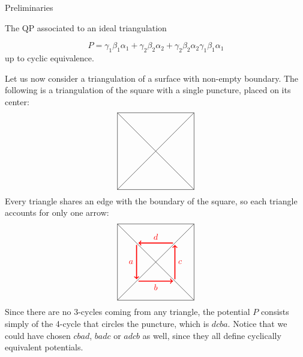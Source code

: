 \begin{chapter}{Preliminaries}
\begin{section}{The QP associated to an ideal triangulation}
\begin{exmp}
\[P = \gamma_1\beta_1\alpha_1+\gamma_2\beta_2\alpha_2+\gamma_2\beta_2\alpha_2\gamma_1\beta_1\alpha_1\]
up to cyclic equivalence.
\end{exmp}
\begin{exmp} Let us now consider a triangulation of a surface with non-empty boundary. The following is a triangulation of the square with a single puncture, placed on its center:
\[
\begin{tikzpicture}[scale=0.8]
\draw (-2,-2) to (-2,2);
\draw (-2,2) to (2,2);
\draw (2,2) to (2,-2);
\draw (2,-2) to (-2,-2);
\draw (-2,-2) to (2,2);
\draw (-2,2) to (2,-2);
\end{tikzpicture}
\]
Every triangle shares an edge with the boundary of the square, so each triangle accounts for only one arrow:
\[
\begin{tikzpicture}[scale=0.8]
\draw (-2,-2) to (-2,2);
\draw (-2,2) to (2,2);
\draw (2,2) to (2,-2);
\draw (2,-2) to (-2,-2);
\draw (-2,-2) to (2,2);
\draw (-2,2) to (2,-2);
\draw[->, red, very thick] (-1,0.9) to node[left] {$a$} (-1, -0.9);
\draw[->, red, very thick] (-0.9,-1) to node[below] {$b$} (0.9, -1);
\draw[->, red, very thick] (1,-0.9) to node[right] {$c$} (1, 0.9);
\draw[->, red, very thick] (0.9, 1) to node[above] {$d$} (-0.9, 1);
\end{tikzpicture}
\]
Since there are no 3-cycles coming from any triangle, the potential $P$ consists simply of the 4-cycle that circles the puncture, which is $dcba$. Notice that we could have chosen $cbad$, $badc$ or $adcb$ as well, since they all define cyclically equivalent potentials.
\end{exmp}
\end{section}
\end{chapter}